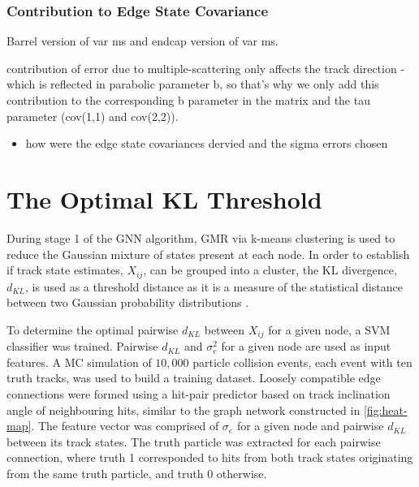 \subsubsection{Contribution to Edge State Covariance}

Barrel version of var ms and endcap version of var ms.

contribution of error due to multiple-scattering only affects the track direction - which is reflected in parabolic parameter b, so that's why we only add this contribution to the corresponding b parameter in the matrix and the tau parameter (cov(1,1) and cov(2,2)).


\begin{itemize}
\item how were the edge state covariances dervied and the sigma errors chosen

\end{itemize}





\section{The Optimal KL Threshold}
\label{chapter-6-kl-threshold}

During stage 1 of the GNN algorithm, GMR via k-means clustering is used to reduce the Gaussian mixture of states present at each node. In order to establish if track state estimates, $X_{ij}$, can be grouped into a cluster, the KL divergence, $d_{KL}$, is used as a threshold distance as it is a measure of the statistical distance between two Gaussian probability distributions \cite{KL, FRUHWIRTH19971}.

To determine the optimal pairwise $d_{KL}$ between $X_{ij}$ for a given node, a SVM classifier was trained. Pairwise $d_{KL}$ and $\sigma_{e}^{2}$ for a given node are used as input features. A MC simulation of $10,000$ particle collision events, each event with ten truth tracks, was used to build a training dataset. Loosely compatible edge connections were formed using a hit-pair predictor based on track inclination angle of neighbouring hits, similar to the graph network constructed in \ref{fig:heat-map}. The feature vector was comprised of $\sigma_{e}$ for a given node and pairwise $d_{KL}$ between its track states. The truth particle was extracted for each pairwise connection, where truth 1 corresponded to hits from both track states originating from the same truth particle, and truth 0 otherwise. 


